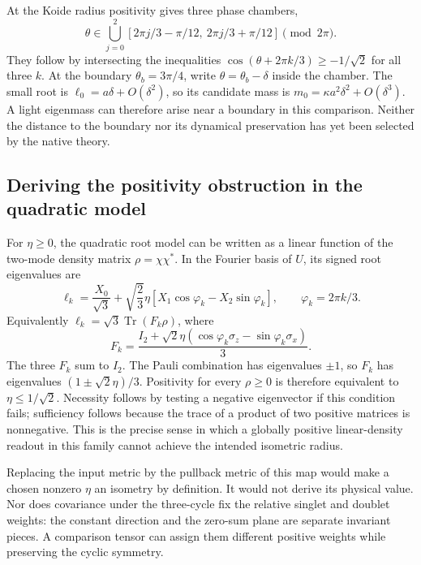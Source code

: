 At the Koide radius positivity gives three phase chambers,
\begin{equation}
 \theta\in\bigcup_{j=0}^2
 [2\pi j/3-\pi/12,\ 2\pi j/3+\pi/12]
 \pmod{2\pi}.
\end{equation}
They follow by intersecting the inequalities
$\cos(\theta+2\pi k/3)\geq-1/\sqrt2$ for all three $k$.
At the boundary $\theta_b=3\pi/4$, write
$\theta=\theta_b-\delta$ inside the chamber. The small root is
$\ell_0=a\delta+O(\delta^2)$, so its candidate mass is
$m_0=\kappa a^2\delta^2+O(\delta^3)$. A light eigenmass can
therefore arise near a boundary in this comparison. Neither the
distance to the boundary nor its dynamical preservation has yet been
selected by the native theory.

\subsection{Deriving the positivity obstruction in the quadratic model}
For $\eta\geq0$, the quadratic root model can be written as a linear function of the
two-mode density matrix $\rho=\chi\chi^*$. In the Fourier basis of
$U$, its signed root eigenvalues are
\begin{equation}
 \ell_k=\frac{X_0}{\sqrt3}
 +\sqrt{\frac23}\eta[X_1\cos\varphi_k-X_2\sin\varphi_k],
 \qquad \varphi_k=2\pi k/3.
\end{equation}
Equivalently $\ell_k=\sqrt3\operatorname{Tr}(F_k\rho)$, where
\begin{equation}
 F_k=\frac{I_2+\sqrt2\eta(\cos\varphi_k\sigma_z-
                               \sin\varphi_k\sigma_x)}{3}.
\end{equation}
The three $F_k$ sum to $I_2$. The Pauli combination has eigenvalues
$\pm1$, so $F_k$ has eigenvalues $(1\pm\sqrt2\eta)/3$.
Positivity for every $\rho\geq0$ is therefore equivalent to
$\eta\leq1/\sqrt2$. Necessity follows by testing a negative
eigenvector if this condition fails; sufficiency follows because
the trace of a product of two positive matrices is nonnegative.
This is the precise sense in which a globally positive linear-density
readout in this family cannot achieve the intended isometric radius.

Replacing the input metric by the pullback metric of this map would
make a chosen nonzero $\eta$ an isometry by definition. It would
not derive its physical value. Nor does covariance under the three-cycle
fix the relative singlet and doublet weights: the constant direction
and the zero-sum plane are separate invariant pieces. A comparison
tensor can assign them different positive weights while preserving
the cyclic symmetry.

